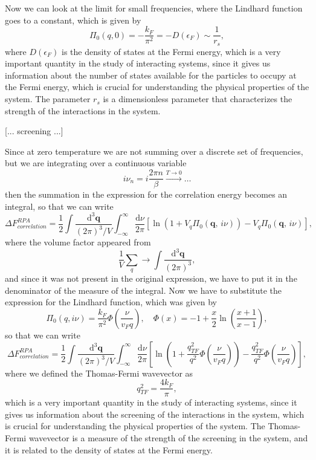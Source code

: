 Now we can look at the limit for small frequencies, where the Lindhard function goes to a constant, which is given by
\[
    \Pi_0(q, 0) = - \frac{k_F}{\pi^2} = - D(\epsilon_F) \sim \frac{1}{r_s},
\]
where \(D(\epsilon_F)\) is the density of states at the Fermi energy, which is a very important quantity in the study of interacting systems, since it gives us information about the number of states available for the particles to occupy at the Fermi energy, which is crucial for understanding the physical properties of the system. The parameter \(r_s\) is a dimensionless parameter that characterizes the strength of the interactions in the system.

[... screening ...]

Since at zero temperature we are not summing over a discrete set of frequencies, but we are integrating over a continuous variable
\[
    i \nu_n = i \frac{2 \pi n}{\beta} \xrightarrow{T \to 0} \dots
\]
then the summation in the expression for the correlation energy becomes an integral, so that we can write
\[
    \Delta F^{RPA}_{correlation} = \frac{1}{2} \int \frac{\mathrm{d}^3 \mathbf{q}}{(2\pi)^3 / V} \int_{-\infty}^{\infty} \frac{\mathrm{d}\nu}{2\pi} \left[ \ln (1 + V_q \Pi_0(\mathbf{q},\, i \nu)) - V_q \Pi_0(\mathbf{q},\, i \nu) \right],
\]
where the volume factor appeared from
\[
    \frac{1}{V} \sum_{q} \to \int \frac{\mathrm{d}^3 \mathbf{q}}{(2\pi)^3},
\]
and since it was not present in the original expression, we have to put it in the denominator of the measure of the integral. Now we have to substitute the expression for the Lindhard function, which was given by
\[
    \Pi_0(q, i \nu) = \frac{k_F}{\pi^2} \Phi(\frac{\nu}{v_F q}), \quad \Phi(x) = - 1 + \frac{x}{2} \ln \left( \frac{x + 1}{x - 1} \right),
\]
so that we can write
\[
    \Delta F^{RPA}_{correlation} = \frac{1}{2} \int \frac{\mathrm{d}^3 \mathbf{q}}{(2\pi)^3 / V} \int_{-\infty}^{\infty} \frac{\mathrm{d}\nu}{2\pi} \left[ \ln (1 + \frac{q_{TF}^2}{q^2} \Phi(\frac{\nu}{v_F q})) - \frac{q_{TF}^2}{q^2} \Phi(\frac{\nu}{v_F q}) \right],
\]
where we defined the Thomas-Fermi wavevector as
\[
    q_{TF}^2 = \frac{4 k_F}{\pi},
\]
which is a very important quantity in the study of interacting systems, since it gives us information about the screening of the interactions in the system, which is crucial for understanding the physical properties of the system. The Thomas-Fermi wavevector is a measure of the strength of the screening in the system, and it is related to the density of states at the Fermi energy.

